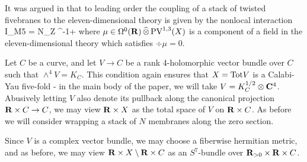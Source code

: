 It was argued in \cite{RSW} that to leading order the coupling of a stack of twisted fivebranes to the eleven-dimensional theory is given by the nonlocal interaction
\beqn\label{eqn:br1}
I_{M5} = N\int_{Z} \div^{-1}\mu \vee \Omega +\cdots
\eeqn
where $\mu \in \Omega^0 (\mathbf{R}) \, \widehat{\otimes} \, {\rm PV}^{1,3}(X)$ is a component of a field in the eleven-dimensional theory which satisfies $\div \mu = 0$.

\parsec
Let $C$ be a curve, and let $V\to C$ be a rank 4-holomorphic vector bundle over $C$ such that $\wedge^{4} V = K_{C}$. This condition again ensures that $X = {\rm Tot} V$ is a Calabi-Yau five-fold - in the main body of the paper, we will take $V = K^{1/2}_{C}\otimes \mathbf{C}^{4}$. Abusively letting $V$ also denote its pullback along the canonical projection $\mathbf{R}\times C \to C$, we may view $\mathbf{R}\times X$ as the total space of $V$ on $\mathbf{R}\times C$. As before we will consider wrapping a stack of $N$ membranes along the zero section.

Since $V$ is a complex vector bundle, we may choose a fiberwise hermitian metric, and as before, we may view $\mathbf{R}\times X \setminus \mathbf{R}\times C$ as an $S^{7}$-bundle over $\mathbf{R}_{>0}\times \mathbf{R}\times C$.



%
%
%
%
%

